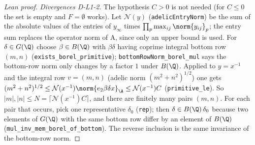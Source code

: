 \begin{proof}[Lean proof]
\emph{Divergences D-L1-2.} The hypothesis $C>0$ is not needed (for $C\le0$ the set is empty and $F=\emptyset$ works). Let $\mathcal N(y)$ (\texttt{adelicEntryNorm}) be the sum of the absolute values of the entries of $y_\infty$ times $\prod_p\max_{ij}\norm{y_{ij}}_p$; the entry sum replaces the operator norm of A, since only an upper bound is used. For $\delta\in G(\Q)$ choose $\beta\in B(\Q)$ with $\beta\delta$ having coprime integral bottom row $(m,n)$ (\texttt{exists\_borel\_primitive}); \texttt{bottomRowNorm\_borel\_mul} says the bottom-row norm only changes by a factor $1$ under $B(\Q)$. Applied to $y=x^{-1}$ and the integral row $v=(m,n)$ (adelic norm $(m^2+n^2)^{1/2}$) one gets $(m^2+n^2)^{1/2}\le\mathcal N(x^{-1})\norm{e_2\beta\delta x}_\A\le\mathcal N(x^{-1})C$ (\texttt{primitive\_le}). So $|m|,|n|\le N=\lceil\mathcal N(x^{-1})C\rceil$, and there are finitely many pairs $(m,n)$. For each pair that occurs, pick one representative $\delta_0$ (\texttt{rep}); then $\delta\in B(\Q)\,\delta_0$ because two elements of $G(\Q)$ with the same bottom row differ by an element of $B(\Q)$ (\texttt{mul\_inv\_mem\_borel\_of\_bottom}). The reverse inclusion is the same invariance of the bottom-row norm.
\end{proof}

